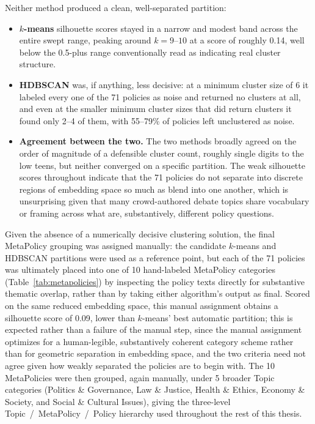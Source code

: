 Neither method produced a clean, well-separated partition:

\begin{itemize}
\item \textbf{$k$-means} silhouette scores stayed in a narrow and modest band across the entire
swept range, peaking around $k=9$--$10$ at a score of roughly 0.14, well below the 0.5-plus range
conventionally read as indicating real cluster structure.

\item \textbf{HDBSCAN} was, if anything, less decisive: at a minimum cluster size of 6 it labeled
every one of the 71 policies as noise and returned no clusters at all, and even at the smaller
minimum cluster sizes that did return clusters it found only 2--4 of them, with 55--79\% of
policies left unclustered as noise.

\item \textbf{Agreement between the two.} The two methods broadly agreed on the order of magnitude
of a defensible cluster count, roughly single digits to the low teens, but neither converged on a
specific partition. The weak silhouette scores throughout indicate that the 71 policies do not
separate into discrete regions of embedding space so much as blend into one another, which is
unsurprising given that many crowd-authored debate topics share vocabulary or framing across what
are, substantively, different policy questions.
\end{itemize}

Given the absence of a numerically decisive clustering solution, the final MetaPolicy grouping
was assigned manually: the candidate $k$-means and HDBSCAN partitions were used as a reference
point, but each of the 71 policies was ultimately placed into one of 10 hand-labeled MetaPolicy
categories (Table~\ref{tab:metapolicies}) by inspecting the policy texts directly for substantive
thematic overlap, rather than by taking either algorithm's output as final. Scored on the same
reduced embedding space, this manual assignment obtains a silhouette score of 0.09, lower than
$k$-means' best automatic partition; this is expected rather than a failure of the manual step,
since the manual assignment optimizes for a human-legible, substantively coherent category
scheme rather than for geometric separation in embedding space, and the two criteria need not
agree given how weakly separated the policies are to begin with. The 10 MetaPolicies were then
grouped, again manually, under 5 broader Topic categories (Politics \& Governance, Law \& Justice,
Health \& Ethics, Economy \& Society, and Social \& Cultural Issues), giving the three-level
Topic~/~MetaPolicy~/~Policy hierarchy used throughout the rest of this thesis.

